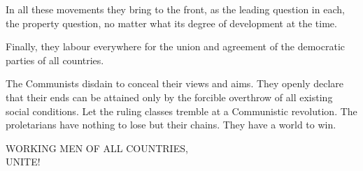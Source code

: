 In all these movements they bring to the front, as the leading question
in each, the property question, no matter what its degree of
development at the time.

Finally, they labour everywhere for the union and agreement of the
democratic parties of all countries.

The Communists disdain to conceal their views and aims. They openly
declare that their ends can be attained only by the forcible overthrow
of all existing social conditions. Let the ruling classes tremble at a
Communistic revolution. The proletarians have nothing to lose but their
chains. They have a world to win.

{

\centering
WORKING MEN OF ALL COUNTRIES,\\ UNITE!

}
